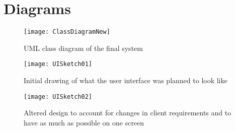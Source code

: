 \chapter{Diagrams}
\label{appendix:d}

  \begin{figure}[h!]
    \centering
    \texttt{[image: ClassDiagramNew]}
    \caption{UML class diagram of the final system}
    \label{fig:class-diagram}
  \end{figure}

  \begin{figure}[h!]
    \centering
    \texttt{[image: UISketch01]}
    \caption{Initial drawing of what the user interface was planned to look like}
    \label{fig:sketch01}
  \end{figure}

  \begin{figure}[h!]
    \centering
    \texttt{[image: UISketch02]}
    \caption{Altered design to account for changes in client requirements and to have as much as possible on one screen}
    \label{fig:sketch02}
  \end{figure}
